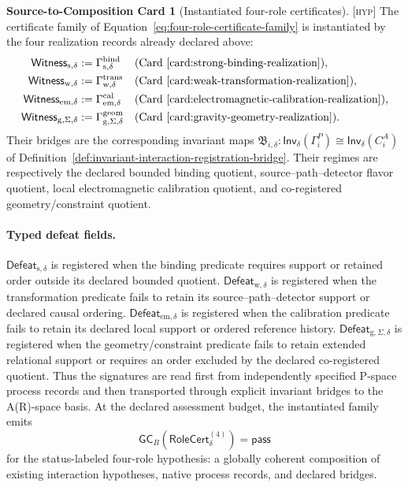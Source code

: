 \documentclass[11pt]{article}
\newcommand{\Inv}{\ensuremath{\mathsf{Inv}}}
\newcommand{\Bridge}{\ensuremath{\mathfrak{B}}}
\newcommand{\Hyp}{\textsc{[hyp]}}
\theoremstyle{definition}
\newtheorem{compositioncard}{Source-to-Composition Card}
\begin{document}
\begin{compositioncard}[Instantiated four-role certificates]
\label{card:instantiated-four-role-certificates}
\Hyp{} The certificate family of
Equation~\eqref{eq:four-role-certificate-family} is instantiated by the four
realization records already declared above:
\begin{align}
\mathsf{Witness}_{\mathrm s,\delta}&:=
\Gamma_{\mathrm s,\delta}^{\mathrm{bind}}
&&\text{(Card~\ref{card:strong-binding-realization})},\nonumber\\
\mathsf{Witness}_{\mathrm w,\delta}&:=
\Gamma_{\mathrm w,\delta}^{\mathrm{trans}}
&&\text{(Card~\ref{card:weak-transformation-realization})},\nonumber\\
\mathsf{Witness}_{\mathrm{em},\delta}&:=
\Gamma_{\mathrm{em},\delta}^{\mathrm{cal}}
&&\text{(Card~\ref{card:electromagnetic-calibration-realization})},\nonumber\\
\mathsf{Witness}_{\mathrm g,\Sigma,\delta}&:=
\Gamma_{\mathrm g,\Sigma,\delta}^{\mathrm{geom}}
&&\text{(Card~\ref{card:gravity-geometry-realization})}.
\label{eq:instantiated-role-witnesses}
\end{align}
Their bridges are the corresponding invariant maps
$\Bridge_{i,\delta}:\Inv_\delta(\Gamma_i^P)\cong\Inv_\delta(C_i^A)$ of
Definition~\ref{def:invariant-interaction-registration-bridge}. Their regimes are
respectively the declared bounded binding quotient, source--path--detector flavor
quotient, local electromagnetic calibration quotient, and co-registered
geometry/constraint quotient. \paragraph{Typed defeat fields.}
$\mathsf{Defeat}_{\mathrm s,\delta}$ is registered when the binding predicate
requires support or retained order outside its declared bounded quotient.
$\mathsf{Defeat}_{\mathrm w,\delta}$ is registered when the transformation
predicate fails to retain its source--path--detector support or declared causal
ordering. $\mathsf{Defeat}_{\mathrm{em},\delta}$ is registered when the calibration
predicate fails to retain its declared local support or ordered reference history.
$\mathsf{Defeat}_{\mathrm g,\Sigma,\delta}$ is registered when the
geometry/constraint predicate fails to retain extended relational support or
requires an order excluded by the declared co-registered quotient.
\label{eq:instantiated-role-defeats}
Thus the signatures are read first from independently specified P-space process
records and then transported through explicit invariant bridges to the A(R)-space
basis. At the declared assessment budget, the instantiated family emits
\begin{equation}
\mathsf{GC}_B\!\left(\mathsf{RoleCert}^{(4)}_\delta\right)=\mathsf{pass}
\label{eq:four-role-gc-pass}
\end{equation}
for the status-labeled four-role hypothesis: a globally coherent composition of
existing interaction hypotheses, native process records, and declared bridges.
\end{compositioncard}
\end{document}
